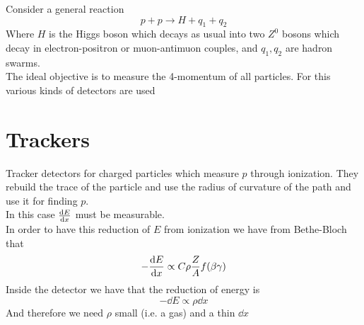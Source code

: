 \documentclass[../qm.tex]{subfiles}
\begin{document}
Consider a general reaction
\begin{equation*}
	p+p\to H+q_1+q_2
\end{equation*}
Where $H$ is the Higgs boson which decays as usual into two $Z^0$ bosons which decay in electron-positron or muon-antimuon couples, and $q_1,q_2$ are hadron swarms.\\
The ideal objective is to measure the 4-momentum of all particles. For this various kinds of detectors are used
\section{Trackers}
Tracker detectors for charged particles which measure $p$ through ionization. They rebuild the trace of the particle and use the radius of curvature of the path and use it for finding $p$.\\
In this case $\dv{E}{x}$ must be measurable.\\
In order to have this reduction of $E$ from ionization we have from Bethe-Bloch that
\begin{equation*}
	-\dv{E}{x}\propto C\rho\frac{Z}{A}f(\beta\gamma)
\end{equation*}
Inside the detector we have that the reduction of energy is
\begin{equation*}
	-\dd E\propto\rho\dd x
\end{equation*}
And therefore we need $\rho$ small (i.e. a gas) and a thin $\dd x$
\end{document}
